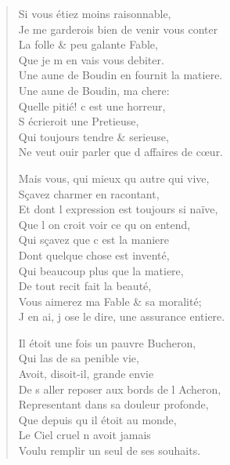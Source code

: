 \begin{verse}
Si vous étiez moins raisonnable, \\
\vin Je me garderois bien de venir vous conter \\
\vin La folle \& peu galante Fable, \\
\vin Que je m\textquotesingle{} en vais vous debiter. \\
Une aune de Boudin en fournit la matiere. \\
\vin Une aune de Boudin, ma chere: \\
\vin Quelle pitié! c\textquotesingle{} est une horreur, \\
\vin S\textquotesingle{} écrieroit une Pretieuse, \\
\vin Qui toujours tendre \& serieuse, \\
Ne veut ouir parler que d\textquotesingle{} affaires de cœur.

\vin Mais vous, qui mieux qu\textquotesingle{} autre qui vive, \\
\vin Sçavez charmer en racontant, \\
Et dont l\textquotesingle{} expression est toujours si naïve, \\
\vin Que l\textquotesingle{} on croit voir ce qu\textquotesingle{} on entend, \\
\vin Qui sçavez que c\textquotesingle{} est la maniere \\
\vin Dont quelque chose est inventé, \\
\vin Qui beaucoup plus que la matiere, \\
\vin De tout recit fait la beauté, \\
Vous aimerez ma Fable \& sa moralité; \\
J\textquotesingle{} en ai, j\textquotesingle{} ose le dire, une assurance entiere.

Il étoit une fois un pauvre Bucheron, \\
\vin Qui las de sa penible vie, \\
\vin Avoit, disoit-il, grande envie \\
De s\textquotesingle{} aller reposer aux bords de l\textquotesingle{} Acheron, \\
\vin Representant dans sa douleur profonde, \\
\vin Que depuis qu\textquotesingle{} il étoit au monde, \\
\vin Le Ciel cruel n\textquotesingle{} avoit jamais \\
Voulu remplir un seul de ses souhaits.


\end{verse}
